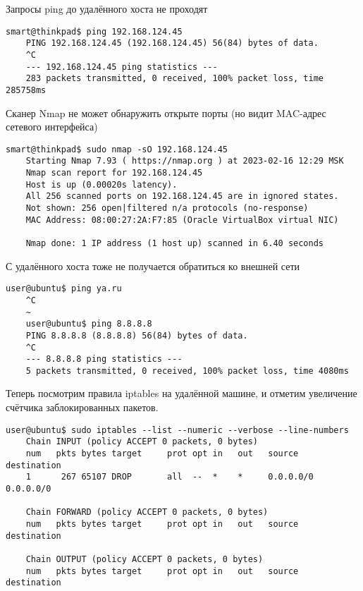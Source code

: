 Запросы ping до удалённого хоста не проходят

\begin{Verbatim}[frame=single]
    smart@thinkpad$ ping 192.168.124.45
    PING 192.168.124.45 (192.168.124.45) 56(84) bytes of data.
    ^C
    --- 192.168.124.45 ping statistics ---
    283 packets transmitted, 0 received, 100% packet loss, time 285758ms
\end{Verbatim}

Сканер Nmap не может обнаружить открыте порты (но видит MAC-адрес сетевого интерфейса)

\begin{Verbatim}[frame=single]
    smart@thinkpad$ sudo nmap -sO 192.168.124.45
    Starting Nmap 7.93 ( https://nmap.org ) at 2023-02-16 12:29 MSK
    Nmap scan report for 192.168.124.45
    Host is up (0.00020s latency).
    All 256 scanned ports on 192.168.124.45 are in ignored states.
    Not shown: 256 open|filtered n/a protocols (no-response)
    MAC Address: 08:00:27:2A:F7:85 (Oracle VirtualBox virtual NIC)

    Nmap done: 1 IP address (1 host up) scanned in 6.40 seconds
\end{Verbatim}

С удалённого хоста тоже не получается обратиться ко внешней сети
\begin{Verbatim}[frame=single]
    user@ubuntu$ ping ya.ru
    ^C
    ~
    user@ubuntu$ ping 8.8.8.8
    PING 8.8.8.8 (8.8.8.8) 56(84) bytes of data.
    ^C
    --- 8.8.8.8 ping statistics ---
    5 packets transmitted, 0 received, 100% packet loss, time 4080ms
\end{Verbatim}

Теперь посмотрим правила iptables на удалённой машине, и отметим увеличение счётчика заблокированных пакетов.
\begin{Verbatim}[frame=single]
    user@ubuntu$ sudo iptables --list --numeric --verbose --line-numbers
    Chain INPUT (policy ACCEPT 0 packets, 0 bytes)
    num   pkts bytes target     prot opt in   out   source      destination
    1      267 65107 DROP       all  --  *    *     0.0.0.0/0   0.0.0.0/0

    Chain FORWARD (policy ACCEPT 0 packets, 0 bytes)
    num   pkts bytes target     prot opt in   out   source      destination

    Chain OUTPUT (policy ACCEPT 0 packets, 0 bytes)
    num   pkts bytes target     prot opt in   out   source      destination
\end{Verbatim}


